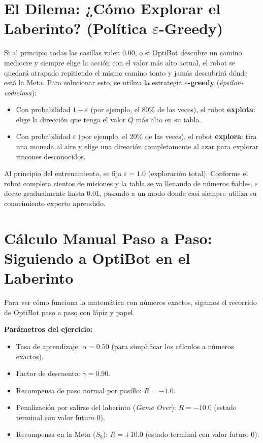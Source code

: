 \section{El Dilema: ¿Cómo Explorar el Laberinto? (Política \texorpdfstring{$\varepsilon$}{epsilon}-Greedy)}
Si al principio todas las casillas valen $0.00$, o si OptiBot descubre un camino mediocre y siempre elige la acción con el valor más alto actual, el robot se quedará atrapado repitiendo el mismo camino tonto y jamás descubrirá dónde está la Meta. Para solucionar esto, se utiliza la estrategia \textbf{$\varepsilon$-greedy} (\textit{épsilon-codiciosa}):
\begin{itemize}
  \item Con probabilidad \textbf{$1 - \varepsilon$} (por ejemplo, el 80\% de las veces), el robot \textbf{explota}: elige la dirección que tenga el valor $Q$ más alto en su tabla.
  \item Con probabilidad \textbf{$\varepsilon$} (por ejemplo, el 20\% de las veces), el robot \textbf{explora}: tira una moneda al aire y elige una dirección completamente al azar para explorar rincones desconocidos.
\end{itemize}
Al principio del entrenamiento, se fija $\varepsilon = 1.0$ (exploración total). Conforme el robot completa cientos de misiones y la tabla se va llenando de números fiables, $\varepsilon$ decae gradualmente hasta $0.01$, pasando a un modo donde casi siempre utiliza su conocimiento experto aprendido.

\section{Cálculo Manual Paso a Paso: Siguiendo a OptiBot en el Laberinto}
Para ver cómo funciona la matemática con números exactos, sigamos el recorrido de OptiBot paso a paso con lápiz y papel.

\textbf{Parámetros del ejercicio:}
\begin{itemize}
  \item Tasa de aprendizaje: $\alpha = 0.50$ (para simplificar los cálculos a números exactos).
  \item Factor de descuento: $\gamma = 0.90$.
  \item Recompensa de paso normal por pasillo: $R = -1.0$.
  \item Penalización por salirse del laberinto (\textit{Game Over}): $R = -10.0$ (estado terminal con valor futuro $0$).
  \item Recompensa en la Meta ($S_9$): $R = +10.0$ (estado terminal con valor futuro $0$).
\end{itemize}

